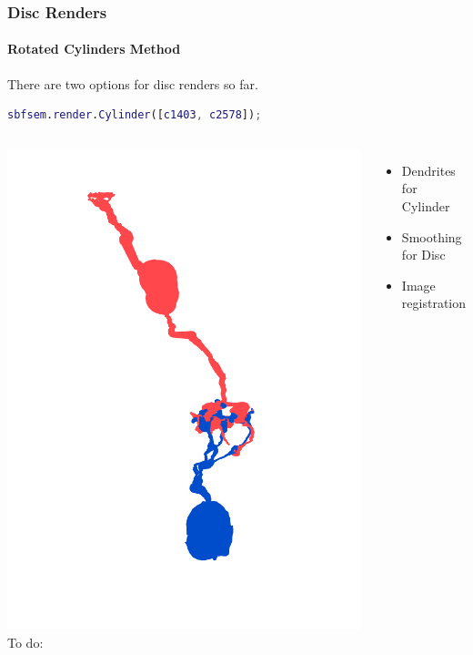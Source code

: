 \documentclass[11pt]{beamer}
\begin{document}
\begin{frame}[fragile]
	\frametitle{Disc Renders}
	\framesubtitle{Rotated Cylinders Method}
	There are two options for disc renders so far.
	\begin{lstlisting}[language=matlab]
	sbfsem.render.Cylinder([c1403, c2578]);\end{lstlisting}
	\begin{columns}
			\includegraphics[height=0.45\textheight]{smidget_path}
			To do:
			\begin{itemize}
				\item Dendrites for Cylinder
				\item Smoothing for Disc
				\item Image registration
			\end{itemize}
	\end{columns}
\end{frame}
\end{document}
